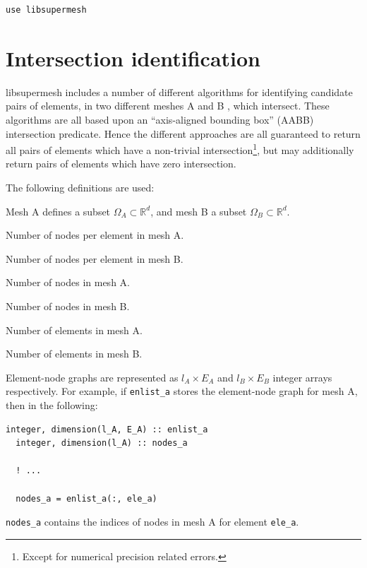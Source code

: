 \documentclass{article}
\begin{document}
\begin{lstlisting}[language=FORTRAN]
  use libsupermesh
\end{lstlisting}

\section{Intersection identification}

libsupermesh includes a number of different algorithms for identifying candidate
pairs of elements, in two different meshes A and B , which intersect. These
algorithms are all based upon an ``axis-aligned bounding box'' (AABB)
intersection predicate. Hence the different approaches are all guaranteed to
return all pairs of elements which have a non-trivial
intersection\footnote{Except for numerical precision related errors.}, but may
additionally return pairs of elements which have zero intersection.

The following definitions are used:
\begin{description}[leftmargin=\parindent,labelindent=\parindent]
  \item[$d$] Mesh A defines a subset $\Omega_A \subset \mathbb{R}^d$, and mesh B
    a subset $\Omega_B \subset \mathbb{R}^d$.
  \item[$l_A$] Number of nodes per element in mesh A.
  \item[$l_B$] Number of nodes per element in mesh B.
  \item[$V_A$] Number of nodes in mesh A.
  \item[$V_B$] Number of nodes in mesh B.
  \item[$E_A$] Number of elements in mesh A.
  \item[$E_B$] Number of elements in mesh B.
\end{description}

Element-node graphs are represented as $l_A \times E_A$ and
$l_B \times E_B$ integer arrays respectively. For example, if \verb+enlist_a+
stores the element-node graph for mesh A, then in the following:
\begin{lstlisting}[language=FORTRAN]
  integer, dimension(l_A, E_A) :: enlist_a
  integer, dimension(l_A) :: nodes_a
  
  ! ...

  nodes_a = enlist_a(:, ele_a)
\end{lstlisting}
\verb+nodes_a+ contains the indices of nodes in mesh A for element \verb+ele_a+.
\end{document}
